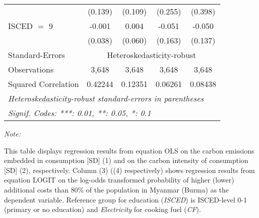 \begin{table}[htbp!]
\begin{adjustbox}{width = 1\textwidth, max height = 0.95\textheight, center}
\begin{threeparttable}[b]
\begin{tabular}{lcccc}
                                 & (0.139)            & (0.109)            & (0.255)       & (0.398)\\   
            ISCED $=$ 9          & -0.001             & 0.004              & -0.051        & -0.050\\   
                                 & (0.038)            & (0.060)            & (0.163)       & (0.137)\\   
            \midrule 
            Standard-Errors & \multicolumn{4}{c}{Heteroskedasticity-robust} \\ 
            Observations         & 3,648              & 3,648              & 3,648         & 3,648\\  
            Squared Correlation  & 0.42244            & 0.12351            & 0.06261       & 0.08438\\  
            \midrule \midrule
            \multicolumn{5}{l}{\emph{Heteroskedasticity-robust standard-errors in parentheses}}\\
            \multicolumn{5}{l}{\emph{Signif. Codes: ***: 0.01, **: 0.05, *: 0.1}}\\
         \end{tabular}
         
         \begin{tablenotes}\item \medskip \textit{Note:}
            \item This table displays regression results from equation OLS on the carbon emissions embedded in consumption [SD] (1) and on the carbon intensity of consumption [SD] (2), respectively. 
                                      Column (3) ((4) respectively) shows regression results from equation LOGIT on the log-odds transformed probability of higher (lower) additional costs than 80\% of the population in Myanmar (Burma) as the dependent variable. Reference group for education (\textit{ISCED}) is ISCED-level 0-1 (primary or no education) and \textit{Electricity} for cooking fuel (\textit{CF}).
         \end{tablenotes}
      \end{threeparttable}
   \end{adjustbox}
\end{table}


